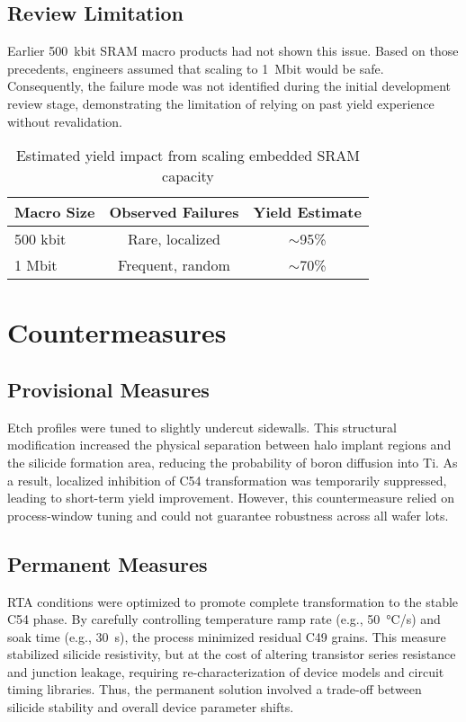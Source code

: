 \documentclass[conference]{IEEEtran}
\begin{document}
\subsection{Review Limitation}
Earlier 500~kbit SRAM macro products had not shown this issue. Based on those precedents, engineers assumed that scaling to 1~Mbit would be safe.
Consequently, the failure mode was not identified during the initial development review stage, demonstrating the limitation of relying on past yield experience without revalidation.

\begin{table}[!t]
\centering
\caption{Estimated yield impact from scaling embedded SRAM capacity}
\label{tab:yield_scaling}
\setlength{\tabcolsep}{4pt}
\begin{tabular}{lcc}
\toprule
Macro Size & Observed Failures & Yield Estimate \\
\midrule
500 kbit & Rare, localized & $\sim$95\% \\
1 Mbit   & Frequent, random & $\sim$70\% \\
\bottomrule
\end{tabular}
\end{table}

\section{Countermeasures}
\subsection{Provisional Measures}
Etch profiles were tuned to slightly undercut sidewalls.
This structural modification increased the physical separation between halo implant regions and the silicide formation area, reducing the probability of boron diffusion into Ti.
As a result, localized inhibition of C54 transformation was temporarily suppressed, leading to short-term yield improvement.
However, this countermeasure relied on process-window tuning and could not guarantee robustness across all wafer lots.

\subsection{Permanent Measures}
RTA conditions were optimized to promote complete transformation to the stable C54 phase.
By carefully controlling temperature ramp rate (e.g., 50~°C/s) and soak time (e.g., 30~s), the process minimized residual C49 grains.
This measure stabilized silicide resistivity, but at the cost of altering transistor series resistance and junction leakage, requiring re-characterization of device models and circuit timing libraries.
Thus, the permanent solution involved a trade-off between silicide stability and overall device parameter shifts.
\end{document}
